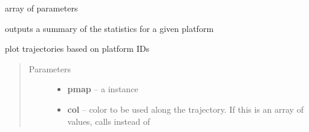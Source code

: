 \documentclass[letterpaper,10pt,english]{sphinxmanual}
\begin{document}
\begin{fulllineitems}
\begin{fulllineitems}
\begin{quote}
\begin{description}
\end{description}\end{quote}

\end{fulllineitems}


\begin{fulllineitems}
\label{altimetry.data:altimetry.data.hydro_data.par_list}
array of parameters

\end{fulllineitems}


\begin{fulllineitems}
\label{altimetry.data:altimetry.data.hydro_data.platform_summary}
outputs a summary of the statistics for a given platform

\end{fulllineitems}


\begin{fulllineitems}
\label{altimetry.data:altimetry.data.hydro_data.plot_track}
plot trajectories based on platform IDs
\begin{quote}\begin{description}
\item[{Parameters}] \leavevmode\begin{itemize}
\item {} 
\textbf{pmap} -- a  instance

\item {} 
\textbf{col} -- color to be used along the trajectory. If this is an array of values, calls  instead of 

\end{itemize}

\end{description}\end{quote}


\end{fulllineitems}
\end{fulllineitems}
\end{document}
